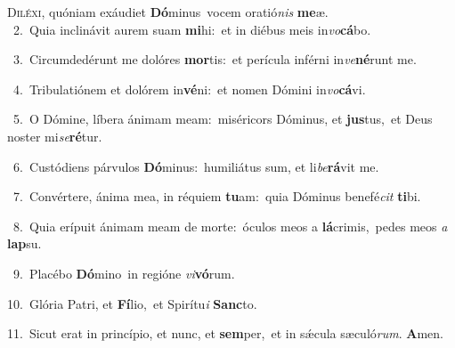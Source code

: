 \lettrine{\initial\textcolor{\initialcolor}{D}}{iléxi,} quóniam exáudiet \textbf{Dó}\-minus~\star vocem oratió\textit{nis} \textbf{me}\-æ.\\
{\numbfont\textcolor{\numbcolor}{~2.}}~Quia inclinávit aurem suam \textbf{mi}\-hi:~\star et in diébus meis in\-\textit{vo}\-\textbf{cá}bo.\par
{\numbfont\textcolor{\numbcolor}{~3.}}~Circumdedérunt me dolóres \textbf{mor}\-tis:~\star et perícula inférni in\-\textit{ve}\-\textbf{né}runt me.\par
{\numbfont\textcolor{\numbcolor}{~4.}}~Tribulatiónem et dolórem in\-\textbf{vé}\-ni:~\star et nomen Dómini in\-\textit{vo}\-\textbf{cá}vi.\par
{\numbfont\textcolor{\numbcolor}{~5.}}~O Dómine, líbera ánimam meam:~\dagger miséricors Dóminus, et \textbf{jus}\-tus,~\star et Deus noster mi\-\textit{se}\-\textbf{ré}tur.\par
{\numbfont\textcolor{\numbcolor}{~6.}}~Custódiens párvulos \textbf{Dó}\-minus:~\star humiliátus sum, et li\-\textit{be}\-\textbf{rá}vit me.\par
{\numbfont\textcolor{\numbcolor}{~7.}}~Convértere, ánima mea, in réquiem \textbf{tu}\-am:~\star quia Dóminus benefé\textit{cit} \textbf{ti}\-bi.\par
{\numbfont\textcolor{\numbcolor}{~8.}}~Quia erípuit ánimam meam de morte:~\dagger óculos meos a \textbf{lá}\-crimis,~\star pedes meos \textit{a} \textbf{lap}\-su.\par
{\numbfont\textcolor{\numbcolor}{~9.}}~Placébo \textbf{Dó}\-mino~\star in regióne \textit{vi}\-\textbf{vó}rum.\par
{\numbfont\textcolor{\numbcolor}{10.}}~Glória Patri, et \textbf{Fí}\-lio,~\star et Spirítu\textit{i} \textbf{Sanc}\-to.\par
{\numbfont\textcolor{\numbcolor}{11.}}~Sicut erat in princípio, et nunc, et \textbf{sem}\-per,~\star et in sǽcula sæculó\-\textit{rum}\-. \textbf{A}\-men.\par
